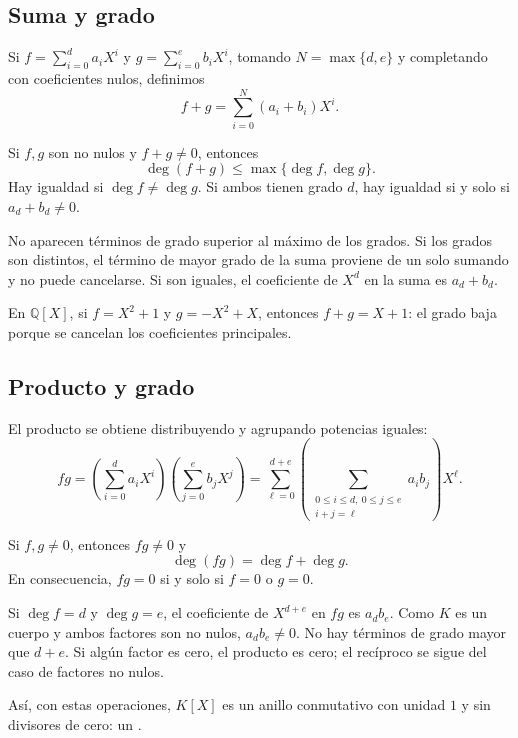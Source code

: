 \subsection{Suma y grado}
Si $f=\sum_{i=0}^{d}a_iX^i$ y $g=\sum_{i=0}^{e}b_iX^i$, tomando
$N=\max\{d,e\}$ y completando con coeficientes nulos, definimos
\[
f+g=\sum_{i=0}^{N}(a_i+b_i)X^i.
\]
\begin{proposicion}
Si $f,g$ son no nulos y $f+g\neq0$, entonces
\[
\deg(f+g)\leq\max\{\deg f,\deg g\}.
\]
Hay igualdad si $\deg f\neq\deg g$. Si ambos tienen grado $d$, hay
igualdad si y solo si $a_d+b_d\neq0$.
\end{proposicion}
\begin{demostracion}
No aparecen términos de grado superior al máximo de los grados.
Si los grados son distintos, el término de mayor grado de la suma
proviene de un solo sumando y no puede cancelarse. Si son iguales,
el coeficiente de $X^d$ en la suma es $a_d+b_d$.
\end{demostracion}
\begin{ejemplo}
En $\mathbb Q[X]$, si $f=X^2+1$ y $g=-X^2+X$, entonces $f+g=X+1$:
el grado baja porque se cancelan los coeficientes principales.
\end{ejemplo}

\subsection{Producto y grado}
El producto se obtiene distribuyendo y agrupando potencias iguales:
\[
fg=\left(\sum_{i=0}^{d}a_iX^i\right)
\left(\sum_{j=0}^{e}b_jX^j\right)
=\sum_{\ell=0}^{d+e}\left(
\sum_{\substack{0\leq i\leq d,\ 0\leq j\leq e\\i+j=\ell}}
a_ib_j\right)X^\ell.
\]
\begin{proposicion}
Si $f,g\neq0$, entonces $fg\neq0$ y
\[
\deg(fg)=\deg f+\deg g.
\]
En consecuencia, $fg=0$ si y solo si $f=0$ o $g=0$.
\end{proposicion}
\begin{demostracion}
Si $\deg f=d$ y $\deg g=e$, el coeficiente de $X^{d+e}$ en $fg$ es
$a_db_e$. Como $K$ es un cuerpo y ambos factores son no nulos,
$a_db_e\neq0$. No hay términos de grado mayor que $d+e$.
Si algún factor es cero, el producto es cero; el recíproco se sigue
del caso de factores no nulos.
\end{demostracion}
Así, con estas operaciones, $K[X]$ es un anillo conmutativo con unidad
$1$ y sin divisores de cero: un .

